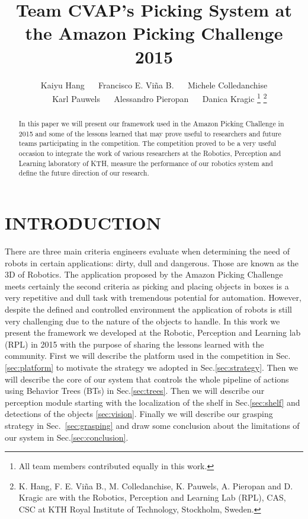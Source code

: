 \documentclass[letterpaper, 10pt, conference]{ieeeconf}
\title{\LARGE \bf Team CVAP's Picking System at the Amazon Picking Challenge 2015}
\author{Kaiyu Hang ~~ Francisco E. Vi\~na B. ~~ Michele Colledanchise \\ ~~ Karl Pauwels ~~ Alessandro Pieropan ~~ Danica Kragic%
\thanks{All team members contributed equally in this work.}%
\thanks{K. Hang, F. E. Vi\~na B., M. Colledanchise, K. Pauwels, A. Pieropan and D. Kragic are with the
Robotics, Perception and Learning Lab (RPL), CAS, CSC at KTH Royal Institute of
Technology, Stockholm, Sweden.}%
}
\begin{document}
                                                                
                                                                                
\maketitle                                                                      
\thispagestyle{empty}                                                           
\pagestyle{empty}



\begin{abstract}

In this paper we will present our framework used in the Amazon Picking Challenge in 2015 and some of the  lessons learned that may prove useful to researchers and future teams participating in the competition. The competition proved to be a very useful occasion to integrate the work of various researchers at the Robotics, Perception and Learning laboratory of KTH, measure the performance of our robotics system and define the future direction of our research.

\end{abstract}

\section{INTRODUCTION}
\label{sec:introduction}

There are three main criteria engineers evaluate when determining the need of robots in certain applications: dirty, dull and dangerous. Those are known as the 3D of Robotics. The application proposed by the Amazon Picking Challenge meets certainly the second criteria as picking and placing objects in boxes is a very repetitive and dull task with tremendous potential
for automation. However, despite the defined and controlled environment the application of robots is still very challenging due to the nature of the objects to handle.
In this work we present the framework we developed at the Robotic, Perception and Learning lab (RPL) in 2015 with the purpose of sharing the lessons learned with the community.
First we will describe the platform used in the competition in Sec.\ref{sec:platform} to motivate the strategy we adopted in Sec.\ref{sec:strategy}. Then we will describe the core of our system that controls the whole pipeline of actions using Behavior Trees (BTs) in Sec.\ref{sec:trees}. Then we will describe our perception module starting with the localization of the shelf in Sec.\ref{sec:shelf} and detections of the objects \ref{sec:vision}. Finally we will describe our grasping strategy in Sec.~\ref{sec:grasping} and draw some conclusion about the limitations of our system in Sec.\ref{sec:conclusion}.
\end{document}
